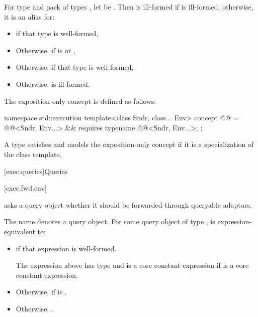 \pnum
For type  and pack of types ,
let  be .
Then  is ill-formed
if  is ill-formed;
otherwise, it is an alias for:
\begin{itemize}
\item
{}
if that type is well-formed,
\item
Otherwise, 
if  is
 or ,
\item
Otherwise, 
if that\linebreak{} type is well-formed,
\item
Otherwise,  is ill-formed.
\end{itemize}

\pnum
The exposition-only concept  is defined as follows:
\begin{codeblock}
namespace std::execution {
  template<class Sndr, class... Env>
    concept @@ = @@<Sndr, Env...> &&
      requires {
        typename @@<Sndr, Env...>;
      };
}
\end{codeblock}

\pnum
A type satisfies and models the exposition-only concept
 if
it is a specialization of the  class template.

[exec.queries]{Queries}

[exec.fwd.env]{}

\pnum
{} asks a query object
whether it should be forwarded through queryable adaptors.

\pnum
The name  denotes a query object.
For some query object  of type ,
 is expression-equivalent to:
\begin{itemize}
\item
{}
if that expression is well-formed.

\mandates
The expression above has type  and
is a core constant expression if  is a core constant expression.
\item
Otherwise,  if  is .
\item
Otherwise, .
\end{itemize}

